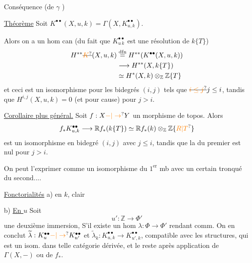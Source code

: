 Conséquence (de $\gamma$ )

\uline{Théorème} Soit $K^{\bullet\bullet}(X,u,k)=\Gamma(X,K_{u,k}^{\bullet\bullet})$.

Alors on a un hom can (du fait que $K_{u\,k}^{\bullet\bullet}$  est une résolution de $k\{T\}$)
\[
\begin{aligned}
H^{**}\deleted{\unsure{K}}(X,u,k)&\overset{\mathrm{dfn}}{=}H^{**}(K^{\bullet\bullet}(X,u,k))\\
&\longrightarrow H^{**}(X,k\{T\})\\
&\simeq H^*(X,k)\otimes_{\mathbb Z}\mathbb Z\{T\}
\end{aligned}
\]
et ceci est un isomorphisme pour les bidegrés $(i,j)$ tels que $\deleted{\unsure{i\leq j}}j\leq i$, tandis que $H^{i,j}(X,u,k)=0$ (et pour cause) pour $j>i$.


\uline{Corollaire plus général.} Soit $f:X\unsure{\mathord{-}|\to}Y$ un morphisme de topos. Alors
\[
f_*K_{u,k}^{\bullet\bullet}\longrightarrow\mathbb R f_*(k\{T\})\simeq\mathbb R f_*(k)\otimes_{\mathbb Z}\mathbb Z\{\unsure{R|T}\}
\]
est un isomorphisme  en bidegré $(i,j)$ avec $j\leq i$, tandis que la  du premier  est nul pour $j>i$.

On peut l'exprimer comme un isomorphisme du $1^{\mathrm{er}}$ mb avec un certain tronqué du second....

\uline{Fonctorialités} a) en $k$, clair

b) \uline{En $u$}\deleted{\unsure{$\Phi$}} Soit
\[
u':\mathbb Z\longrightarrow\Phi'
\]
une deuxième immersion, S'il existe un hom $\lambda:\Phi\longrightarrow\Phi'$ rendant comm.
On en conclut $\widetilde\lambda:K_u^{\bullet\bullet}\unsure{\mathord{-}|\to}K_{u'}^{\bullet\bullet}$ et $\widetilde\lambda_k:K_{u,k}^{\bullet\bullet}\longrightarrow K_{u',k}^{\bullet\bullet}$, compatible avec  les structures, qui est un isom. dans telle catégorie dérivée, et le reste après application de $\Gamma(X,-)$ ou de $f_*$.

